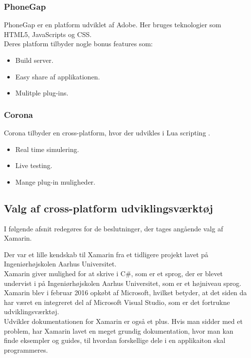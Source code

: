 \subsubsection{PhoneGap}
PhoneGap\cite{PhoneGap} er en platform udviklet af Adobe\cite{Adobe}. Her bruges teknologier som HTML5\cite{HTML5}, JavaScripts\cite{JavaScript} og CSS\cite{CSS}. \\
Deres platform tilbyder nogle bonus features som:
\begin{itemize}[-]
	\item Build server.
	\item Easy share af applikationen.
	\item Mulitple plug-ins.
\end{itemize}

\clearpage

\subsubsection{Corona}
Corona\cite{Corona} tilbyder en cross-platform, hvor der udvikles i Lua scripting \cite{Lua}.
\begin{itemize}[-]
	\item Real time simulering.
	\item Live testing.
	\item Mange plug-in muligheder.
\end{itemize}

\subsection{Valg af cross-platform udviklingsværktøj}
I følgende afsnit redegøres for de beslutninger, der tages angående valg af Xamarin.

Der var et lille kendskab til Xamarin fra et tidligere projekt lavet på Ingeniørhøjskolen Aarhus Universitet. \\
Xamarin giver mulighed for at skrive i C\#, som er et sprog, der er blevet undervist i på Ingeniørhøjskolen Aarhus Universitet, som er et højniveau sprog. \\
Xamarin blev i februar 2016 opkøbt af Microsoft, hvilket betyder, at det siden da har været en integreret del af Microsoft Visual Studio, som er det fortrukne udviklingsværktøj.\\
Udvikler dokumentationen for Xamarin er også et plus. Hvis man sidder med et problem, har Xamarin lavet en meget grundig dokumentation, hvor man kan finde eksempler og guides, til hvordan forskellige dele i en applikaiton skal programmeres.


